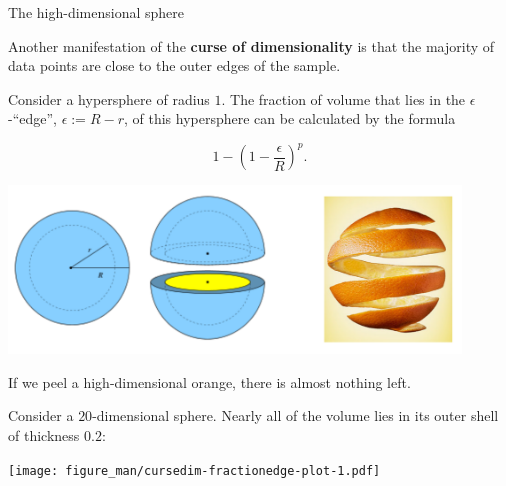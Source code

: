 \begin{vbframe}{The high-dimensional sphere}


Another manifestation of the \textbf{curse of dimensionality} is that the majority of data points are close to the outer edges of the sample.
 

Consider a hypersphere of radius $1$. The fraction of volume that lies in the $\epsilon$-\enquote{edge}, $\epsilon := R - r$, of this hypersphere can be calculated by the formula

\vspace*{-0.7cm}

$$
1-\left(1-\frac{\epsilon}{R}\right)^p.
$$

\vspace*{-0.5cm}

\begin{center}
\includegraphics[width=0.9\textwidth]{figure_man/orange.png}
\end{center}

\vspace*{-0.5cm}

If we peel a high-dimensional orange, there is almost nothing left. 

\flushleft


\framebreak

Consider a $20$-dimensional sphere. Nearly all of the volume lies in its outer shell of thickness $0.2$:
\medskip

\vspace*{0.1cm}
\begin{center}
\texttt{[image: figure\_man/cursedim-fractionedge-plot-1.pdf]}
\end{center}

\end{vbframe}

